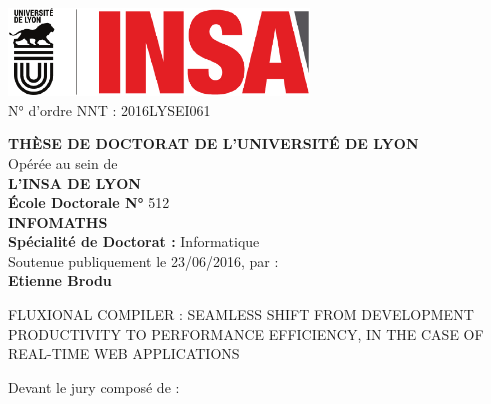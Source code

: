 \begin{center}
\includegraphics[width=8cm]{../resources/logos.pdf}%
\\[1em]


{N° d'ordre NNT : 2016LYSEI061 \hfill}

\vfill
{
  \fontsize{14pt}{16pt}\selectfont%

  {\large\textbf{\MakeUppercase{Thèse de doctorat de l'université de Lyon}}}\\[1em]

  Opérée au sein de\\
  {\large\textbf{\MakeUppercase{L'INSA de Lyon}}}\\[1em]

  {\large\textbf{École Doctorale N° }512}\\
  {\large\textbf{\MakeUppercase{InfoMaths}}}\\[1em]

  {\large\textbf{Spécialité de Doctorat : }Informatique}\\[1em]

  Soutenue publiquement le 23/06/2016, par :\\
  {\large\textbf{Etienne Brodu}}\\[1em]
}

\vfill

\parbox{\linewidth}{%
\vspace{10pt}
\redline%
\vspace{10pt}
\secfont\fontsize{20pt}{25pt}\selectfont%
\MakeUppercase{Fluxional compiler : seamless shift from development productivity to performance efficiency, in the case of real-time web applications}%
\vspace{10pt}%
\redline%
\vspace{10pt}
}

\vfill

Devant le jury composé de : \\[1em]


\end{center}
